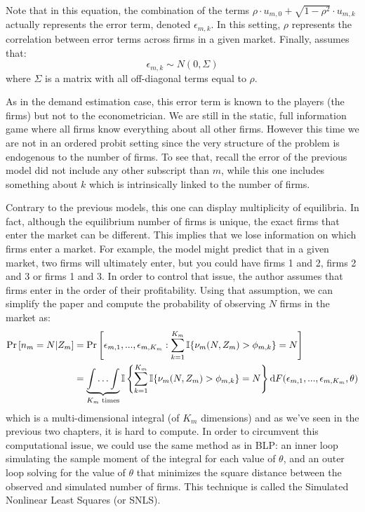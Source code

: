 Note that in this equation, the combination of the terms $\rho \cdot u_{m,0} + \sqrt{1 - \rho^2}\cdot u_{m,k} $ actually represents the error term, denoted $\epsilon_{m,k}$. In this setting, $\rho$ represents the correlation between error terms across firms in a given market. Finally, \cite{berry_92} assumes that: $$\epsilon_{m,k} \sim N(0, \Sigma) $$ where $\Sigma$ is a matrix with all off-diagonal terms equal to $\rho$.

As in the demand estimation case, this error term is known to the players (the firms) but not to the econometrician. We are still in the static, full information game where all firms know everything about all other firms. However this time we are not in an ordered probit setting since the very structure of the problem is endogenous to the number of firms. To see that, recall the error of the previous model did not include any other subscript than $m$, while this one includes something about $k$ which is intrinsically linked to the number of firms.

Contrary to the previous models, this one can display multiplicity of equilibria. In fact, although the equilibrium number of firms is unique, the exact firms that enter the market can be different. This implies that we lose information on which firms enter a market. For example, the model might predict that in a given market, two firms will ultimately enter, but you could have firms 1 and 2, firms 2 and 3 or firms 1 and 3. In order to control that issue, the author assumes that firms enter in the order of their profitability. Using that assumption, we can simplify the paper and compute the probability of observing $N$ firms in the market as: \begin{align*}
\operatorname{Pr}\left[n_m = N\vert Z_m\right] & = \operatorname{Pr}\left[\epsilon_{m,1}, ..., \epsilon_{m,K_m} : \sum_{k=1}^{K_m}\mathbb{I}\{\nu_m(N, Z_m) >\phi_{m,k}\} = N \right] \\
& = \underbrace{\int\hdots\int}_{K_m\text{ times}}\mathbb{I}\left\lbrace\sum_{k=1}^{K_m}\mathbb{I}\{\nu_m(N, Z_m) >\phi_{m,k}\} = N\right\rbrace\mathrm{d} F(\epsilon_{m,1}, ..., \epsilon_{m,K_m}, \theta)
\end{align*} which is a multi-dimensional integral (of $K_m$ dimensions) and as we've seen in the previous two chapters, it is hard to compute. In order to circumvent this computational issue, we could use the same method as in BLP: an inner loop simulating the sample moment of the integral for each value of $\theta$, and an outer loop solving for the value of $\theta$ that minimizes the square distance between the observed and simulated number of firms. This technique is called the Simulated Nonlinear Least Squares (or SNLS).

